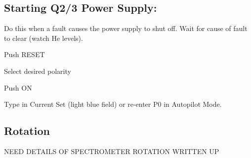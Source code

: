 {\subsection{Starting Q2/3 Power Supply:}

 Do this when a fault causes the power supply to shut off.
 Wait for cause of fault to clear (watch He levels). 
 \begin{list}{.~}{\setlength{\itemsep}{-0.15cm}}
   \item Push RESET 
   \item Select desired polarity
   \item Push ON
   \item Type in Current Set (light blue field) or re-enter P0 in Autopilot Mode.
\end{list}

} %

\subsection{Rotation}

NEED DETAILS OF SPECTROMETER ROTATION WRITTEN UP
